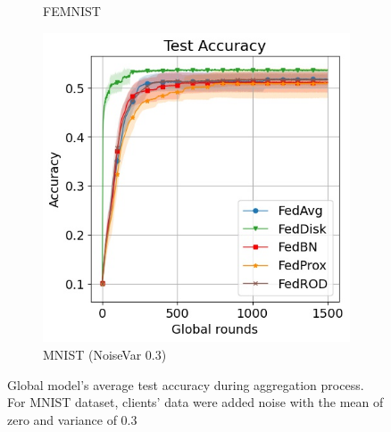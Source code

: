 \documentclass[mathfont=newtx]{uai2023} %
\begin{document}
\begin{figure}[ht!]
\begin{subfigure}[t]{0.3\linewidth}
		\caption{FEMNIST}
		\label{fig:acc_femnist}
	\end{subfigure}
	\hspace{0.01em}%
	\begin{subfigure}[t]{0.3\linewidth}	
		\includegraphics[width=\linewidth]{Figures/mnist/test_acc}
		\caption{MNIST (NoiseVar 0.3)  }
		\label{fig:acc_mnist}
	\end{subfigure}
	\caption{Global model's average test accuracy during aggregation process. For MNIST dataset, clients' data were added noise with the mean of zero and variance of 0.3  }
	\label{fig:acc_all}
\end{figure}
\end{document}
